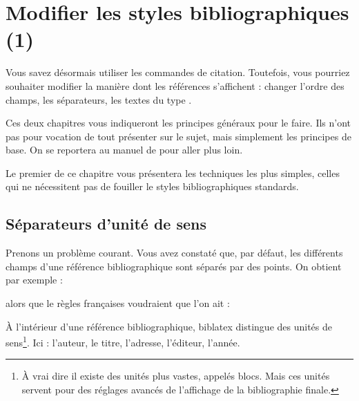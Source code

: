 \chapter{Modifier les styles bibliographiques (1)}\label{style1}

    \begin{prealable}
    
    Vous savez désormais utiliser les commandes de citation. Toutefois, vous pourriez souhaiter modifier la manière dont les références s'affichent :  changer l'ordre des champs, les séparateurs, les textes du type .
    
    Ces deux chapitres vous indiqueront les principes généraux pour le faire. Ils n'ont pas pour vocation de tout présenter sur le sujet, mais simplement les principes de base. On se reportera au manuel de  pour aller plus loin.
    
    Le premier de ce chapitre vous présentera les techniques les plus simples, celles qui ne nécessitent pas de fouiller le styles bibliographiques standards. 
    
    
    \end{prealable}
    
    
\section{Séparateurs d'unité de sens}\label{unitebiblio}
    
Prenons un problème courant. Vous avez constaté que, par défaut, les différents champs d'une référence bibliographique sont séparés par des points. On obtient par exemple :
    
    \bibverbose

    
    \renewcommand{\newunitpunct}[0]{\adddot\addspace} %
    
    \begin{quotation}
    \cite{Urner1952}
    \end{quotation}
    
alors que le règles françaises voudraient que l'on ait :
    
\renewcommand{\newunitpunct}[0]{\addcomma\addspace} %
    
    \begin{quotation}
    \cite{Urner1952}
    \end{quotation}
    
    \bibverbosetrad

À l'intérieur d'une référence bibliographique, biblatex distingue des unités de sens\footnote{À vrai dire il existe des unités plus vastes, appelés blocs. Mais ces unités servent pour des réglages avancés de l'affichage de la bibliographie finale.}. Ici : l'auteur, le titre, l'adresse, l'éditeur, l'année. 

